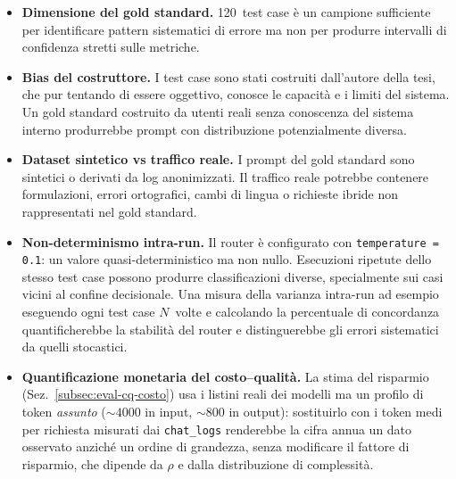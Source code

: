 \begin{itemize}
  \item \textbf{Dimensione del gold standard.} 120~test case è un campione sufficiente per identificare
  pattern sistematici di errore ma non per produrre intervalli di confidenza stretti sulle metriche.

  \item \textbf{Bias del costruttore.} I test case sono stati costruiti dall'autore della tesi,
  che pur tentando di essere oggettivo, conosce le capacità e i limiti del sistema.
  Un gold standard costruito da utenti reali senza conoscenza del sistema interno produrrebbe prompt con distribuzione potenzialmente diversa.

  \item \textbf{Dataset sintetico vs traffico reale.} I prompt del gold standard sono sintetici o derivati da log anonimizzati.
  Il traffico reale potrebbe contenere formulazioni, errori ortografici, cambi di lingua o richieste ibride non rappresentati nel gold standard.

  \item \textbf{Non-determinismo intra-run.} Il router è configurato con \texttt{temperature = 0.1}: un valore quasi-deterministico ma non nullo.
  Esecuzioni ripetute dello stesso test case possono produrre classificazioni diverse, specialmente sui casi vicini al confine decisionale.
  Una misura della varianza intra-run ad esempio eseguendo ogni test case $N$~volte e calcolando la percentuale di concordanza quantificherebbe la stabilità del router e
  distinguerebbe gli errori sistematici da quelli stocastici.

  \item \textbf{Quantificazione monetaria del costo--qualità.} La stima del
  risparmio (Sez.~\ref{subsec:eval-cq-costo}) usa i listini reali dei modelli
  ma un profilo di token \emph{assunto} ($\sim 4000$ in input, $\sim 800$ in
  output): sostituirlo con i token medi per richiesta misurati dai
  \texttt{chat\_logs} renderebbe la cifra annua un dato osservato anziché un
  ordine di grandezza, senza modificare il fattore di risparmio, che dipende
  da $\rho$ e dalla distribuzione di complessità.

 \end{itemize}
